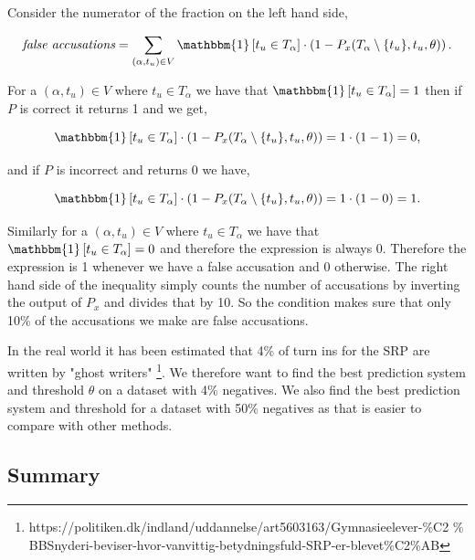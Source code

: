 Consider the numerator of the fraction on the left hand side,

\begin{equation}
    \textit{false accusations} = \sum_{(\alpha, t_u) \in V}
    \mathbbm{1}\left[t_u \in T_\alpha\right] \cdot
    \left(1 - P_x(T_\alpha \setminus \{t_u\}, t_u, \theta)\right).
\end{equation}

For a $(\alpha, t_u) \in V$ where $t_u \in T_\alpha$ we have that
$\mathbbm{1}\left[t_u \in T_\alpha\right] = 1$ then if $P$ is correct it returns 1 and we
get,

\begin{equation}
    \mathbbm{1}\left[t_u \in T_\alpha\right] \cdot
    \left(1 - P_x(T_\alpha \setminus \{t_u\}, t_u, \theta)\right) =
    1 \cdot (1 - 1) = 0,
\end{equation}

and if $P$ is incorrect and returns 0 we have,

\begin{equation}
    \mathbbm{1}\left[t_u \in T_\alpha\right] \cdot
    \left(1 - P_x(T_\alpha \setminus \{t_u\}, t_u, \theta)\right) =
    1 \cdot (1 - 0) = 1.
\end{equation}

Similarly for a $(\alpha, t_u) \in V$ where $t_u \in T_\alpha$ we have that
$\mathbbm{1}\left[t_u \in T_\alpha\right] = 0$ and therefore the expression is always
0. Therefore the expression is 1 whenever we have a false accusation and 0
otherwise. The right hand side of the inequality simply counts the number of
accusations by inverting the output of $P_x$ and divides that by 10. So the
condition makes sure that only 10\% of the accusations we make are false
accusations.

In the real world it has been estimated that 4\% of turn
ins for the \gls{SRP} are written by "ghost writers"
\footnote{https://politiken.dk/indland/uddannelse/art5603163/Gymnasieelever-\%C2
\% BBSnyderi-beviser-hvor-vanvittig-betydningsfuld-SRP-er-blevet\%C2\%AB}.
We therefore want to find the best prediction system and threshold $\theta$
on a dataset with 4\% negatives. We also find the best prediction system and
threshold for a dataset with 50\% negatives as that is easier to compare with
other methods.


\subsection{Summary}

